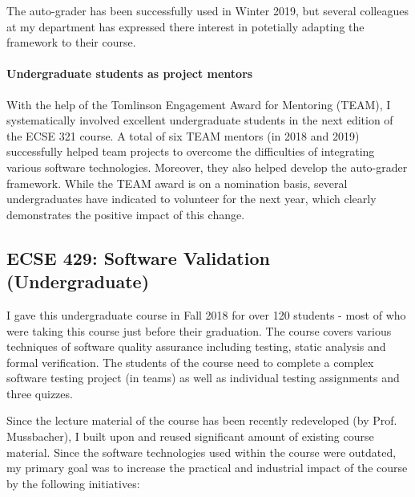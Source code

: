 The auto-grader has been successfully used in Winter 2019, but several colleagues at my department has expressed there interest in potetially adapting the framework to their course. 

\paragraph{Undergraduate students as project mentors}
With the help of the Tomlinson Engagement Award for Mentoring (TEAM), I systematically involved excellent undergraduate students in the next edition of the ECSE 321 course. A total of six TEAM mentors (in 2018 and 2019) successfully helped team projects to overcome the difficulties of integrating various software technologies. Moreover, they also helped develop the auto-grader framework. While the TEAM award is on a nomination basis, several undergraduates have indicated to volunteer for the next year, which clearly demonstrates the positive impact of this change.


\subsection{ECSE 429: Software Validation (Undergraduate)}

I gave this undergraduate course in Fall 2018 for over 120 students - most of who were taking this course just before their graduation. The course covers various techniques of software quality assurance including testing, static analysis and formal verification. The students of the course need to complete a complex software testing project (in teams) as well as individual testing assignments and three quizzes.

Since the lecture material of the course has been recently redeveloped (by Prof. Mussbacher), I built upon and reused significant amount of existing course material. Since the software technologies used within the course were outdated, my primary goal was to increase the practical and industrial impact of the course by the following initiatives:

